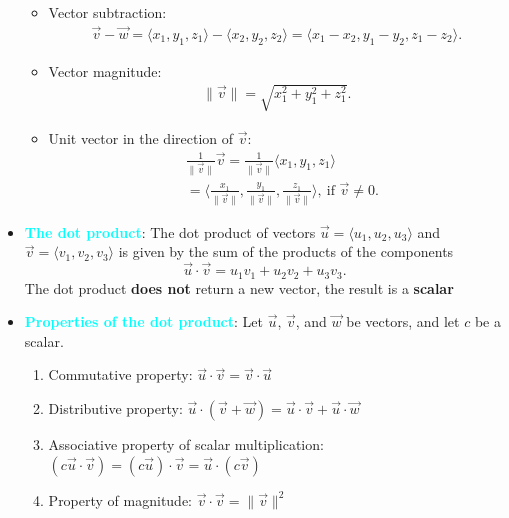 \documentclass{report}
\begin{document}
\begin{itemize}
\begin{itemize}
            \item Vector subtraction: 
                \begin{align*}
                    \vec{v} - \vec{w} = \langle x_1, y_1, z_1 \rangle - \langle x_2, y_2, z_2 \rangle = \langle x_1 - x_2, y_1 - y_2, z_1 - z_2 \rangle
                .\end{align*}
            \item Vector magnitude: 
                \begin{align*}
                    \|\vec{v}\| = \sqrt{x_1^2 + y_1^2 + z_1^2}
                .\end{align*}
            \item Unit vector in the direction of $\vec{v}$:
                \begin{align*}
                    &\frac{1}{\|\vec{v}\|}\vec{v} = \frac{1}{\|\vec{v}\|}\langle x_1, y_1, z_1 \rangle  \\
                    &= \bigg\langle \frac{x_1}{\|\vec{v}\|}, \frac{y_1}{\|\vec{v}\|}, \frac{z_1}{\|\vec{v}\|} \bigg\rangle,\ \text{if } \vec{v} \neq 0
                .\end{align*}
            \end{itemize}
            \item \textbf{\textcolor{cyan}{The dot product}}:
                The dot product of vectors $\vec{u} = \langle u_1, u_2, u_3 \rangle$ and $\vec{v} = \langle v_1, v_2, v_3 \rangle$ is given by the sum of the products of the components
                \[
                    \vec{u} \cdot \vec{v} = u_1v_1 + u_2v_2 + u_3v_3.
                \]
                The dot product \textbf{does not} return a new vector, the result is a \textbf{scalar}
            \item \textbf{\textcolor{cyan}{Properties of the dot product}}:
                Let $\vec{u}$, $\vec{v}$, and $\vec{w}$ be vectors, and let $c$ be a scalar.
                \begin{enumerate}
                    \item Commutative property: $\vec{u} \cdot \vec{v} = \vec{v} \cdot \vec{u}$
                    \item Distributive property: $\vec{u} \cdot (\vec{v} + \vec{w}) = \vec{u} \cdot \vec{v} + \vec{u} \cdot \vec{w}$
                    \item Associative property of scalar multiplication: $(c\vec{u} \cdot \vec{v}) = (c\vec{u}) \cdot \vec{v} = \vec{u} \cdot (c\vec{v})$
                    \item Property of magnitude: $\vec{v} \cdot \vec{v} = \|\vec{v}\|^2$

\end{enumerate}
\end{itemize}
\end{document}
